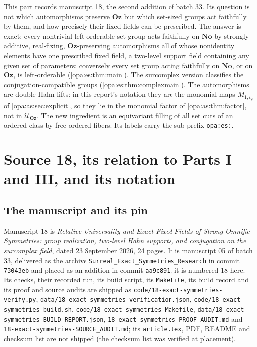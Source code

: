\documentclass[11pt,oneside]{article}
\numberwithin{equation}{section}
\theoremstyle{definition}
\theoremstyle{remark}
\newcommand{\No}{\mathbf{No}}
\newcommand{\Oz}{\mathbf{Oz}}
\newcommand{\UU}{\mathcal U}
\newcommand{\lbl}[1]{\nolinkurl{#1}}
\newcommand{\fn}[1]{\nolinkurl{#1}}
\begin{document}
This part records manuscript 18, the second addition of batch 33. Its question is not which automorphisms preserve $\Oz$ but
which set-sized groups act faithfully by them, and how precisely their fixed fields can be prescribed. The answer is exact:
every nontrivial left-orderable set group acts faithfully on $\No$ by strongly additive, real-fixing, $\Oz$-preserving
automorphisms all of whose nonidentity elements have one prescribed fixed field, a two-level support field containing any given
set of parameters; conversely every set group acting faithfully on $\No$, or on $\Oz$, is left-orderable
(\cref{opa:es:thm:main}). The surcomplex version classifies the conjugation-compatible groups (\cref{opa:es:thm:complexmain}).
The automorphisms are double Hahn lifts: in this report's notation they are the monomial maps $M_{1,\iota_\varphi}$ of
\cref{opa:as:sec:explicit}, so they lie in the monomial factor of \cref{opa:as:thm:factor}, not in $\UU_\Oz$. The new ingredient is
an equivariant filling of all set cuts of an ordered class by free ordered fibers. Its labels carry the sub-prefix \lbl{opa:es:}.

\section{Source 18, its relation to Parts I and III, and its notation}\label{opa:es:sec:intro}

\subsection{The manuscript and its pin}\label{opa:es:sub:source}

Manuscript 18 is \emph{Relative Universality and Exact Fixed Fields of Strong Omnific Symmetries: group realization, two-level
Hahn supports, and conjugation on the surcomplex field}, dated 23 September 2026, 24 pages. It is manuscript 05 of batch 33,
delivered as the archive \fn{Surreal_Exact_Symmetries_Research} in commit \texttt{73043eb} and placed as an addition in commit
\texttt{aa9c891}; it is numbered 18 here. Its checks, their recorded run, its build script, its \fn{Makefile}, its build record
and its proof and source audits are shipped as \fn{code/18-exact-symmetries-verify.py},
\fn{data/18-exact-symmetries-verification.json}, \fn{code/18-exact-symmetries-build.sh}, \fn{code/18-exact-symmetries-Makefile},
\fn{data/18-exact-symmetries-BUILD_REPORT.json}, \fn{18-exact-symmetries-PROOF_AUDIT.md} and
\fn{18-exact-symmetries-SOURCE_AUDIT.md}; its \fn{article.tex}, PDF, README and checksum list are not shipped (the checksum list
was verified at placement).
\end{document}

